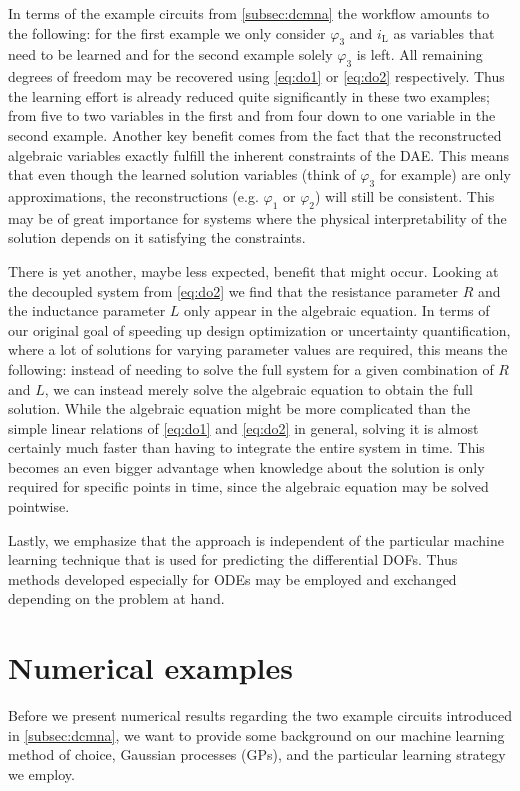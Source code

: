 \documentclass[AMA,STIX1COL]{WileyNJD-v2}
\newcommand{\mr}[1]{\mathrm{#1}}
\begin{document}
In terms of the example circuits from \autoref{subsec:dcmna} the workflow amounts to the following: for the first example we only consider $\varphi_3$ and $i_\mr{L}$ as variables that need to be learned and for the second example solely $\varphi_3$ is left. All remaining degrees of freedom may be recovered using \eqref{eq:do1} or \eqref{eq:do2} respectively. Thus the learning effort is already reduced quite significantly in these two examples; from five to two variables in the first and from four down to one variable in the second example. Another key benefit comes from the fact that the reconstructed algebraic variables exactly fulfill the inherent constraints of the DAE. This means that even though the learned solution variables (think of $\varphi_3$ for example) are only approximations, the reconstructions (e.g. $\varphi_1$ or $\varphi_2$) will still be consistent. This may be of great importance for systems where the physical interpretability of the solution depends on it satisfying the constraints.

There is yet another, maybe less expected, benefit that might occur. Looking at the decoupled system from \eqref{eq:do2} we find that the resistance parameter $R$ and the inductance parameter $L$ only appear in the algebraic equation. In terms of our original goal of speeding up design optimization or uncertainty quantification, where a lot of solutions for varying parameter values are required, this means the following: instead of needing to solve the full system for a given combination of $R$ and $L$, we can instead merely solve the algebraic equation to obtain the full solution. While the algebraic equation might be more complicated than the simple linear relations of \eqref{eq:do1} and \eqref{eq:do2} in general, solving it is almost certainly much faster than having to integrate the entire system in time. This becomes an even bigger advantage when knowledge about the solution is only required for specific points in time, since the algebraic equation may be solved pointwise.

Lastly, we emphasize that the approach is independent of the particular machine learning technique that is used for predicting the differential DOFs. Thus methods developed especially for ODEs may be employed and exchanged depending on the problem at hand.

\section{Numerical examples}
\label{sec:ne}
Before we present numerical results regarding the two example circuits introduced in \autoref{subsec:dcmna}, we want to provide some background on our machine learning method of choice, Gaussian processes (GPs), and the particular learning strategy we employ.
\end{document}
